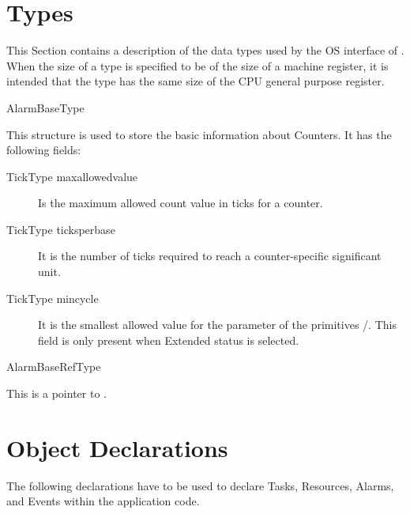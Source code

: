 \pagebreak





\section{Types}
\label{sec:types}

This Section contains a description of the data types used by the OS
interface of \ee. When the size of a type is specified to be of the
size of a machine register, it is intended that the type has the same
size of the CPU general purpose register.

\begin{type}{AlarmBaseType}
  \begin{typedescription}
    This structure is used to store the basic information about
    Counters. It has the following fields:
    \begin{description}
    \item[TickType maxallowedvalue] Is the maximum allowed count value
      in ticks for a counter.
    \item[TickType ticksperbase] It is the number of ticks required to
      reach a counter-specific significant unit.
    \item[TickType mincycle] It is the smallest allowed value for the
       parameter of the primitives 
      /. This field is only
      present when Extended status is selected.
    \end{description}
  \end{typedescription}
\end{type}

\begin{type}{AlarmBaseRefType}
  \begin{typedescription}
    This is a pointer to .
  \end{typedescription}
\end{type}


\pagebreak









\section{Object Declarations}
The following declarations have to be used to declare Tasks, Resources,
Alarms, and Events within the application code.

